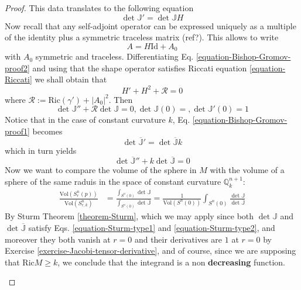 \begin{proof}
This data translates to the following equation
\begin{equation}
\label{equation-Bishop-Gromov-proof1}
\det\mathbb{J}'=\det\mathbb{J}H
\end{equation}
Now recall that any self-adjoint operator can be expressed uniquely as a
multiple of the identity plus a symmetric traceless matrix (ref?). This allows 
to write
\begin{equation}
\label{equation-Bishop-Gromov-proof2}
A=H\text{Id}+A_0
\end{equation}
with $A_0$ symmetric and traceless. Differentiating Eq.
\ref{equation-Bishop-Gromov-proof2} and using that the shape operator satisfies
Riccati equation \ref{equation-Riccati} we shall obtain that
$$
H'+H^2+\mathcal{R}=0
$$
where $\mathcal{R}:=\text{Ric}(\gamma')+|A_0|^2$. Then
\begin{equation}
\label{equation-Sturm-type1}
\det\mathbb{J}''+\mathcal{R}\det\mathbb{J}=0,
\det\mathbb{J}(0)=,\det\mathbb{J}'(0)=1
\end{equation}
\bigskip
Notice that in the case of constant curvature $k$, Eq. 
\ref{equation-Bishop-Gromov-proof1} becomes
\begin{equation}
\label{equation-Bishop-Gromov-proof3}
\det\overline{\mathbb{J}}'=\det\overline{\mathbb{J}}k
\end{equation}
which in turn yields
\begin{equation}
\label{equation-Sturm-type2}
\det\overline{\mathbb{J}}''+k\det\overline{\mathbb{J}}=0
\end{equation}
Now we want to compare the volume of the sphere in $M$ with the volume of a
sphere of the same raduis in the space of constant curvature 
$\mathbb{Q}_k^{n+1}$:
\begin{align*}
\frac{\text{Vol}(S_r^{n}(p))}{\text{Vol}(S^{n}_{r,k})}&=
\frac{\int_{S^n(0)}\det \mathbb{J}}{\int_{S^n(0)}\det\overline{\mathbb{J}}}
=\frac{1}{\text{Vol}(S^n(0))}
\int_{S^n(0)}\frac{\det\mathbb{J}}{\det\overline{\mathbb{J}}}
\end{align*}
By Sturm Theorem \ref{theorem-Sturm}, which we may apply since both 
$\det\mathbb{J}$ and $\det\overline{\mathbb{J}}$ satisfy Eqs.
 \ref{equation-Sturm-type1} and \ref{equation-Sturm-type2}, and moreover 
they both vanish at $r=0$ and their derivatives are $1$ at $r=0$ by Exercise
\ref{exercise-Jacobi-tensor-derivative}, and of course, since we are supposing
that $\text{Ric}M\geq k$, we conclude that the integrand is a non {\bf
decreasing} function.
\begin{remark}[Pregunta]

\end{remark}
\end{proof}
